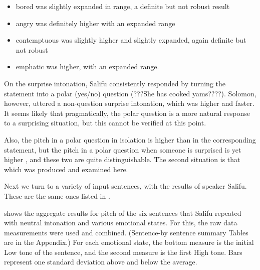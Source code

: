 \documentclass[output=paper]{langsci/langscibook}
\begin{document}
\begin{itemize}
\item bored was slightly expanded in range, a definite but not robust result
\item angry was definitely higher with an expanded range
\item contemptuous was slightly higher and slightly expanded, again definite but not robust
\item emphatic was higher, with an expanded range. 
\end{itemize}

On the surprise intonation, Salifu consistently responded by turning the statement into a polar (yes/no) question (???She has cooked yams????). Solomon, however, uttered a non-question surprise intonation, which was higher and faster. It seems likely that pragmatically, the polar question is a more natural response to a surprising situation, but this cannot be verified at this point. 

Also, the pitch in a polar question in isolation is higher than in the corresponding statement, but the pitch in a polar question when someone is surprised is yet higher \citep{Cahill2012}, and these two are quite distinguishable. The second situation is that which was produced and examined here.


Next we turn to a variety of input sentences, with the results of speaker Salifu. These are the same ones listed in .


 shows the aggregate results for pitch of the six sentences that Salifu repeated with neutral intonation and various emotional states. For this, the raw data measurements were used and combined. (Sentence-by sentence summary Tables are in the Appendix.) For each emotional state, the bottom measure is the initial Low tone of the sentence, and the second measure is the first High tone. Bars represent one standard deviation above and below the average.

\end{document}
